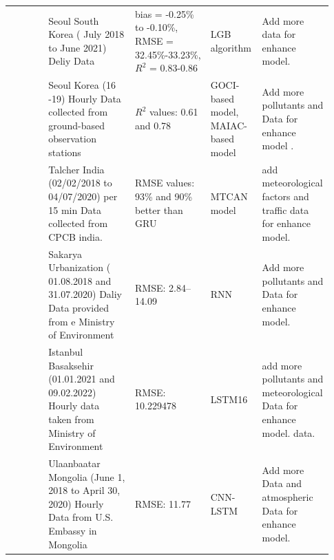\documentclass[a4paper, fleqn]{cas-sc}
\theoremstyle{definition}
\theoremstyle{remark}
\begin{document}
\begin{landscape}
{\begin{longtable}[h!]{ p{0.12\linewidth} p{0.27\linewidth} p{0.16\linewidth} p{0.16\linewidth} p{0.22\linewidth} }
 \cite{kim2022short}         & Seoul South Korea ( July 2018 to   June 2021) Deliy Data                                                 & bias = -0.25\% to -0.10\%,  RMSE =   32.45\%-33.23\%,  $R^2$ = 0.83-0.86                                     & LGB algorithm                                                       & Add more data for enhance model.                                                                            \\
  \cite{lee2021potential}            & Seoul Korea (16 -19) Hourly Data   collected from ground-based observation stations                      & $R^2$ values:  0.61 and 0.78                                                                                & GOCI-based model, MAIAC-based   model                                & Add more pollutants and Data for enhance model .                                                                   \\
 \cite{samal2021multi}  & Talcher India (02/02/2018 to   04/07/2020) per 15 min Data collected from CPCB india.                    & RMSE values:  93\% and 90\% better than GRU                                                              & MTCAN model                                                         & add meteorological factors and traffic data for enhance model.                                                               \\
 \cite{kurnaz2022prediction}          & Sakarya Urbanization (   01.08.2018 and 31.07.2020) Daliy Data provided from e Ministry of Environment   & RMSE:   2.84–14.09                                                                                       & RNN                                                                 & Add more pollutants and Data for enhance model.    \\
 \cite{das2022prediction}           & Istanbul Basaksehir (01.01.2021   and 09.02.2022) Hourly data taken from Ministry of Environment         & RMSE: 10.229478                                                                                          & LSTM16                                                              & add more pollutants and  meteorological Data for enhance model. data.                                          \\
\cite{natsagdorj2023prediction}              & Ulaanbaatar Mongolia  (June 1,  2018 to  April 30,  2020) Hourly Data from U.S.   Embassy in Mongolia      & RMSE: 11.77                                                                                              & CNN-LSTM                                                            & Add more Data and atmospheric Data for enhance model.  \\

\end{longtable}}
\end{landscape}
\end{document}

